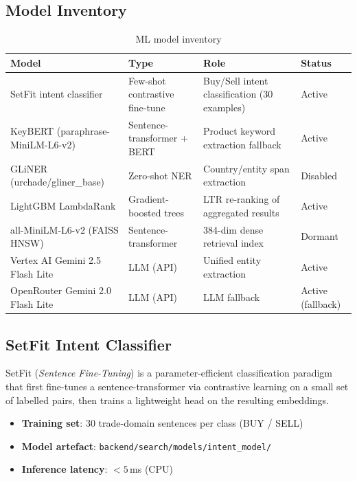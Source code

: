 \documentclass[12pt,a4paper]{article}
\begin{document}
\subsection{Model Inventory}

\begin{table}[H]
\centering
\renewcommand{\arraystretch}{1.4}
\begin{tabularx}{\textwidth}{>{\raggedright}p{3.8cm}>{\raggedright}p{3.2cm}X>{\raggedright\arraybackslash}p{2.0cm}}
\toprule
\rowcolor{tableheader!20}
\textbf{Model} & \textbf{Type} & \textbf{Role} & \textbf{Status} \\
\midrule
SetFit intent classifier &
  Few-shot contrastive fine-tune &
  Buy/Sell intent classification (30 examples) &
  Active \\
KeyBERT (paraphrase-MiniLM-L6-v2) &
  Sentence-transformer + BERT &
  Product keyword extraction fallback &
  Active \\
GLiNER (urchade/gliner\_base) &
  Zero-shot NER &
  Country/entity span extraction &
  Disabled \\
LightGBM LambdaRank &
  Gradient-boosted trees &
  LTR re-ranking of aggregated results &
  Active \\
all-MiniLM-L6-v2 (FAISS HNSW) &
  Sentence-transformer &
  384-dim dense retrieval index &
  Dormant \\
Vertex AI Gemini 2.5 Flash Lite &
  LLM (API) &
  Unified entity extraction &
  Active \\
OpenRouter Gemini 2.0 Flash Lite &
  LLM (API) &
  LLM fallback &
  Active (fallback) \\
\bottomrule
\end{tabularx}
\caption{ML model inventory}
\end{table}

\subsection{SetFit Intent Classifier}

SetFit (\emph{Sentence Fine-Tuning}) is a parameter-efficient classification paradigm
that first fine-tunes a sentence-transformer via contrastive learning on a small set of
labelled pairs, then trains a lightweight head on the resulting embeddings.

\begin{itemize}
  \item \textbf{Training set}: 30 trade-domain sentences per class (BUY / SELL)
  \item \textbf{Model artefact}: \texttt{backend/search/models/intent\_model/}
  \item \textbf{Inference latency}: $<5$\,ms (CPU)
\end{itemize}
\end{document}
